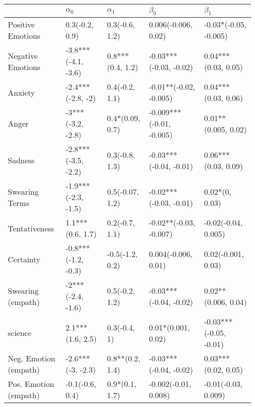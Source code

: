 \begin{tabular}{lllll}
\toprule
{} &           $\alpha_0$ &        $\alpha_1$ &                 $\beta_0$ &               $\beta_1$ \\
\midrule
Positive Emotions     &       0.3(-0.2, 0.9) &    0.3(-0.6, 1.2) &       0.006(-0.006, 0.02) &   -0.03*(-0.05, -0.005) \\
Negative Emotions     &  -3.8***(-4.1, -3.6) &  0.8***(0.4, 1.2) &    -0.03***(-0.03, -0.02) &     0.04***(0.03, 0.05) \\
Anxiety               &    -2.4***(-2.8, -2) &    0.4(-0.2, 1.1) &    -0.01**(-0.02, -0.005) &     0.04***(0.03, 0.06) \\
Anger                 &    -3***(-3.2, -2.8) &   0.4*(0.09, 0.7) &  -0.009***(-0.01, -0.005) &     0.01**(0.005, 0.02) \\
Sadness               &  -2.8***(-3.5, -2.2) &    0.3(-0.8, 1.3) &    -0.03***(-0.04, -0.01) &     0.06***(0.03, 0.09) \\
Swearing Terms        &  -1.9***(-2.3, -1.5) &   0.5(-0.07, 1.2) &    -0.02***(-0.03, -0.01) &          0.02*(0, 0.03) \\
Tentativeness         &     1.1***(0.6, 1.7) &    0.2(-0.7, 1.1) &    -0.02**(-0.03, -0.007) &     -0.02(-0.04, 0.005) \\
Certainty             &  -0.8***(-1.2, -0.3) &   -0.5(-1.2, 0.2) &       0.004(-0.006, 0.01) &      0.02(-0.001, 0.03) \\
Swearing (empath)     &    -2***(-2.4, -1.6) &    0.5(-0.2, 1.2) &    -0.03***(-0.04, -0.02) &     0.02**(0.006, 0.04) \\
science               &     2.1***(1.6, 2.5) &      0.3(-0.4, 1) &        0.01*(0.001, 0.02) &  -0.03***(-0.05, -0.01) \\
Neg. Emotion (empath) &    -2.6***(-3, -2.3) &   0.8**(0.2, 1.4) &    -0.03***(-0.04, -0.02) &     0.03***(0.02, 0.05) \\
Pos. Emotion (empath) &      -0.1(-0.6, 0.4) &    0.9*(0.1, 1.7) &      -0.002(-0.01, 0.008) &     -0.01(-0.03, 0.009) \\
\bottomrule
\end{tabular}
